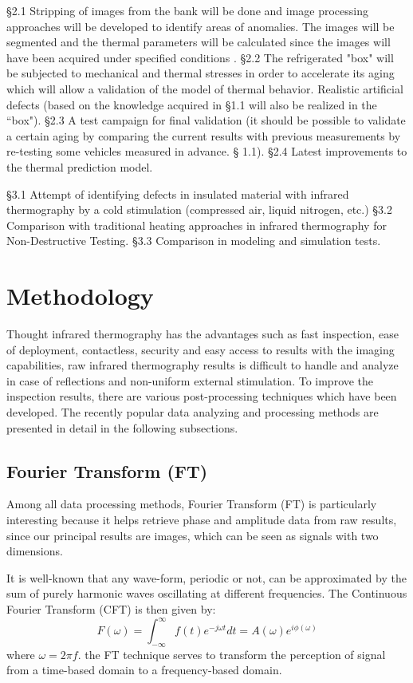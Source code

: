 \S 2.1 Stripping of images from the bank will be done and image processing approaches will be developed to identify areas of anomalies. The images will be segmented and the thermal parameters will be calculated since the images will have been acquired under specified conditions \citep{Ibarra-Castanedo2013Methods}. §2.2 The refrigerated "box" will be subjected to mechanical and thermal stresses in order to accelerate its aging which will allow a validation of the model of thermal behavior. Realistic artificial defects (based on the knowledge acquired in §1.1 will also be realized in the ``box"). §2.3 A test campaign for final validation (it should be possible to validate a certain aging by comparing the current results with previous measurements by re-testing some vehicles measured in advance. § 1.1). §2.4 Latest improvements to the thermal prediction model.

\S 3.1 Attempt of identifying defects in insulated material with infrared thermography by a cold stimulation (compressed air, liquid nitrogen, etc.) \S 3.2 Comparison with traditional heating approaches in infrared thermography for Non-Destructive Testing. \S 3.3 Comparison in modeling and simulation tests.

\section{Methodology}
Thought infrared thermography has the advantages such as fast inspection, ease of deployment, contactless, security and easy access to results with the imaging capabilities, raw infrared thermography results is difficult to handle and analyze in case of reflections and non-uniform external stimulation. To improve the inspection results, there are various post-processing techniques which have been developed. The recently popular data analyzing and processing methods are presented in detail in the following subsections.
\subsection{Fourier Transform (FT)}
Among all data processing methods, Fourier Transform (FT) is particularly interesting because it helps retrieve phase and amplitude data from raw results, since our principal results are images, which can be seen as signals with two dimensions.

It is well-known that any wave-form, periodic or not, can be approximated by the sum of purely harmonic waves oscillating at different frequencies. The Continuous Fourier Transform (CFT) is then given by:
\begin{equation}
F(\omega) = \int_{-\infty}^{\infty}f(t)e^{-j\omega t}dt = A(\omega)e^{i\phi(\omega)}
\end{equation}
where $\omega = 2 \pi f$. the FT technique serves to transform the perception of signal from a time-based domain to a frequency-based domain.

